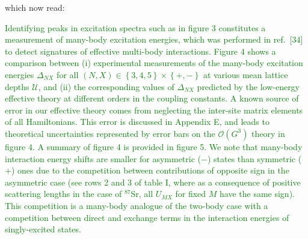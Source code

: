 \documentclass[preprint,showkeys,nofootinbib]{revtex4-1}
\newcommand{\p}[1]{\left(#1\right)} %
\renewcommand{\set}[1]{\left\{#1\right\}} %
\renewcommand{\O}{\mathcal{O}}
\newcommand{\U}{\mathcal{U}}
\newcommand{\1}{\mathds{1}}
\newcommand{\green}[1]{\textcolor{green}{#1}}
\begin{document}
\begin{enumerate}
  which now read:

  \green{Identifying peaks in excitation spectra such as in figure 3
    constitutes a measurement of many-body excitation energies, which
    was performed in ref.~[34] to detect signatures of effective
    multi-body interactions.  Figure 4 shows a comparison between (i)
    experimental measurements of the many-body excitation energies
    $\Delta_{NX}$ for all $\p{N,X}\in\set{3,4,5}\times\set{+,-}$ at
    various mean lattice depths $\U$, and (ii) the corresponding
    values of $\Delta_{NX}$ predicted by the low-energy effective
    theory at different orders in the coupling constants.  A known
    source of error in our effective theory comes from neglecting the
    inter-site matrix elements of all Hamiltonians.  This error is
    discussed in Appendix E, and leads to theoretical uncertainties
    represented by error bars on the $\O\p{G^3}$ theory in figure 4.
    A summary of figure 4 is provided in figure 5.  We note that
    many-body interaction energy shifts are smaller for asymmetric
    ($-$) states than symmetric ($+$) ones due to the competition
    between contributions of opposite sign in the asymmetric case (see
    rows 2 and 3 of table I, where as a consequence of positive
    scattering lengths in the case of $^{87}$Sr, all $U_{MX}$ for
    fixed $M$ have the same sign).  This competition is a many-body
    analogue of the two-body case with a competition between direct
    and exchange terms in the interaction energies of singly-excited
    states.}


\end{enumerate}
\end{document}
